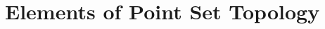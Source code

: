 \documentclass[class=mike-apostol-mathematical-analysis,crop=false]{standalone}
\begin{document}
\chapter{Elements of Point Set Topology}
\end{document}
